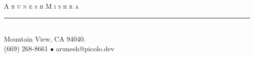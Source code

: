 
\setlength{\topmargin}{-0.6in}  %
\setlength{\textheight}{9.3in}  %
\addtolength{\textwidth}{-0.1in}  %
\setlength{\headrulewidth}{0pt} %
\setlength{\headsep}{0.2in}     %
\setlength{\headheight}{12pt}   %

\newdimen\mylinewidth 
\setlength{\mylinewidth}{\resumewidth}
\addtolength{\mylinewidth}{-0.4in}

\def\bull{\vrule height 0.8ex width .7ex depth -.1ex }
\newcommand{\lineunder}{\vspace*{-8pt} \\ \hspace*{-18pt} \rule{\mylinewidth}{0.5pt} \\}
\newcommand{\justline}{\hspace*{-18pt} \hrulefill \\\vspace{4pt}}
\newcommand{\header}[1]{{\hspace*{-15pt}\vspace*{2pt} \large{\textsc{#1}}} \vspace*{-2pt} \lineunder}
\newcommand{\contact}[3]{
\vspace*{-8pt}
\begin{center}
{\LARGE \scshape {#1}}
\lineunder
#2\\
#3
\end{center}
\vspace*{-8pt}
}

\lhead{\hspace*{-\sectionwidth}} %
\cfoot{}  %
\pagestyle{fancy} %
 
\contact{A r u n e s h \hspace{3mm}    M i s h r a}
{  Mountain View, CA 94040.}
{(669) 268-8661 $\bullet$ arunesh@picolo.dev}
\thispagestyle{empty} %

